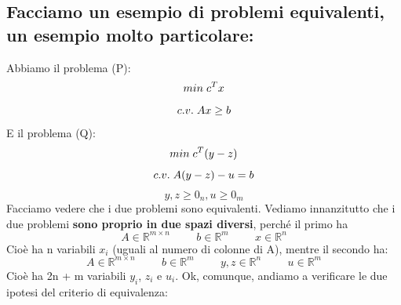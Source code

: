 \subsection{Facciamo un esempio di problemi equivalenti, un esempio molto particolare:} 
Abbiamo il problema (P):
\begin{equation*}
    min \hspace{0.1cm} c^Tx
\end{equation*}
\begin{equation*}
    c.v. \hspace{0.1cm} Ax \geq b
\end{equation*}
E il problema (Q):
\begin{equation*}
    min \hspace{0.1cm} c^T(y-z)
\end{equation*}
\begin{equation*}
    c.v. \hspace{0.1cm} A(y-z) - u = b
\end{equation*}
\begin{equation*}
    y,z \geq 0_n, u \geq 0_m
\end{equation*}
Facciamo vedere che i due problemi sono equivalenti. Vediamo innanzitutto che i due problemi \textbf{sono proprio in due spazi diversi}, perché il primo ha
\begin{equation*}
    A \in \mathbb{R}^{m \times n} \hspace{1cm} b \in \mathbb{R}^m \hspace{1cm} x \in \mathbb{R}^n
\end{equation*}
Cioè ha n variabili $x_i$ (uguali al numero di colonne di A), mentre il secondo ha:
\begin{equation*}
    A \in \mathbb{R}^{m \times n} \hspace{1cm} b \in \mathbb{R}^m \hspace{1cm} y,z \in \mathbb{R}^n \hspace{1cm} u \in \mathbb{R}^m
\end{equation*}
Cioè ha 2n + m variabili $y_i$, $z_i$ e $u_i$. Ok, comunque, andiamo a verificare le due ipotesi del criterio di equivalenza:
